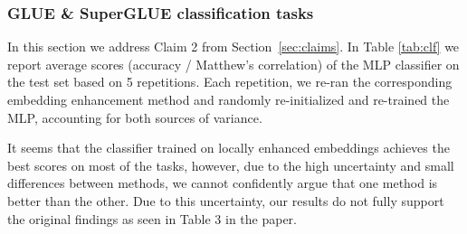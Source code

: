 \subsubsection{GLUE \& SuperGLUE classification tasks}

In this section we address Claim 2 from Section~\ref{sec:claims}. In Table \ref{tab:clf} we report average scores (accuracy / Matthew's correlation) of the MLP classifier on the test set based on 5 repetitions. Each repetition, we re-ran the corresponding embedding enhancement method and randomly re-initialized and re-trained the MLP, accounting for both sources of variance. 

It seems that the classifier trained on locally enhanced embeddings achieves the best scores on most of the tasks, however, due to the high uncertainty and small differences between methods, we cannot confidently argue that one method is better than the other. Due to this uncertainty, our results do not fully support the original findings as seen in Table 3 in the paper.

